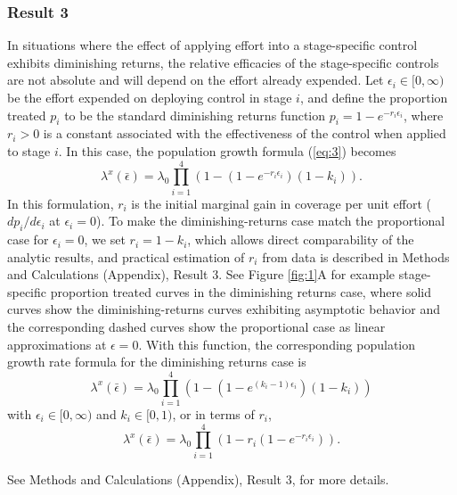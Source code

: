 \documentclass[onecolumn]{article}
\begin{document}
\subsubsection*{Result 3}
In situations where the effect of applying effort into a stage-specific control exhibits diminishing returns, the relative efficacies of the stage-specific controls are not absolute and will depend on the effort already expended. Let $\epsilon_i \in [0, \infty)$ be the effort expended on deploying control in stage $i$, and define the proportion treated $p_i$ to be the standard diminishing returns function $p_i=1-e^{-r_i\epsilon_i}$, where $r_i > 0$ is a constant associated with the effectiveness of the control when applied to stage $i$.  
In this case, the population growth formula (\ref{eq:3}) becomes
\begin{equation}\label{eq:5} \lambda^x(\bar{\epsilon})=\lambda_0 \prod_{i=1}^4(1-(1-e^{-r_i\epsilon_i})(1-k_i)). \end{equation}
In this formulation, $r_i$ is the initial marginal gain in coverage per unit effort ($dp_i/d\epsilon_i$ at $\epsilon_i=0$). To make the diminishing-returns case match the proportional case for $\epsilon_i=0$, we set $r_i=1-k_i$, which allows direct comparability of the analytic results, and practical estimation of $r_i$ from data is described in Methods and Calculations (Appendix), Result 3. See Figure \ref{fig:1}A for example stage-specific proportion treated curves in the diminishing returns case, where solid curves show the diminishing-returns curves exhibiting asymptotic behavior and the corresponding dashed curves show the proportional case as linear approximations at $\epsilon=0$. With this function, the corresponding population growth rate formula for the diminishing returns case is
\begin{equation}\label{eq:7} \lambda^x(\bar{\epsilon})=\lambda_0 \prod_{i=1}^4(1-(1-e^{(k_i-1)\epsilon_i})(1-k_i)) \end{equation}
with $\epsilon_i\in[0,\infty)$ and $k_i\in[0,1)$, or in terms of $r_i$,
\begin{equation}\label{eq:8} \lambda^x(\bar{\epsilon})=\lambda_0 \prod_{i=1}^4(1-r_i(1-e^{-r_i\epsilon_i})). \end{equation}

See Methods and Calculations (Appendix), Result 3, for more details.
\end{document}
